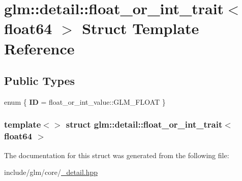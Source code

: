 \hypertarget{structglm_1_1detail_1_1float__or__int__trait_3_01float64_01_4}{\section{glm\-:\-:detail\-:\-:float\-\_\-or\-\_\-int\-\_\-trait$<$ float64 $>$ \-Struct \-Template \-Reference}
\label{structglm_1_1detail_1_1float__or__int__trait_3_01float64_01_4}
}
\subsection*{\-Public \-Types}
\begin{DoxyCompactItemize}
\item 
enum \{ {\bfseries \-I\-D} =  float\-\_\-or\-\_\-int\-\_\-value\-:\-:\-G\-L\-M\-\_\-\-F\-L\-O\-A\-T
 \}
\end{DoxyCompactItemize}
\subsubsection*{template$<$$>$ struct glm\-::detail\-::float\-\_\-or\-\_\-int\-\_\-trait$<$ float64 $>$}



\-The documentation for this struct was generated from the following file\-:\begin{DoxyCompactItemize}
\item 
include/glm/core/\hyperlink{__detail_8hpp}{\-\_\-detail.\-hpp}\end{DoxyCompactItemize}
